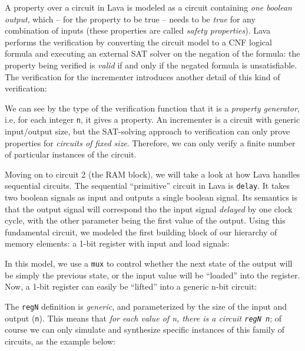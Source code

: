 \documentclass[a4paper]{article}
\begin{document}
                A property over a circuit in Lava is modeled as a circuit containing \emph{one
                    boolean output}, which -- for the property to be true -- needs to be \emph{true}
                for any combination of inputs (these properties are called \emph{safety
                    properties}). Lava performs the verification by converting the circuit model to
                a CNF logical formula and executing an external SAT solver on the negation of the
                formula: the property being verified is \emph{valid} if and only if the negated
                formula is unsatisfiable. The verification for the incrementer introduces another
                detail of this kind of verification:
                

                We can see by the type of the verification function that it is a \emph{property
                    generator}, i.e, for each integer \texttt{n}, it gives a property. An
                incrementer is a circuit with generic input/output size, but the SAT-solving
                approach to verification can only prove properties for \emph{circuits of fixed
                    size}. Therefore, we can only verify a finite number of particular instances of
                the circuit.

                Moving on to circuit 2 (the RAM block), we will take a look at how Lava handles
                sequential circuits. The sequential ``primitive'' circuit in Lava is \texttt{delay}.
                It takes two boolean signals as input and outputs a single boolean signal. Its
                semantics is that the output signal will correspond tho the input signal
                \emph{delayed} by one clock cycle, with the other parameter being the first value of
                the output.  Using this fundamental circuit, we modeled the first building block of
                our hierarchy of memory elements: a 1-bit register with input and load signals:
                

                In this model, we use a \texttt{mux} to control whether the next state of the output
                will be simply the previous state, or the input value will be ``loaded'' into the
                register. Now, a 1-bit register can easily be ``lifted'' into a generic n-bit
                circuit:
                

                The \texttt{regN} definition is \emph{generic}, and parameterized by the size of the
                input and output (\texttt{n}). This means that \emph{for each value of n, there is a
                circuit \texttt{regN n}}; of course we can only simulate and synthesize specific
                instances of this family of circuits, as the example below:
                
\end{document}
